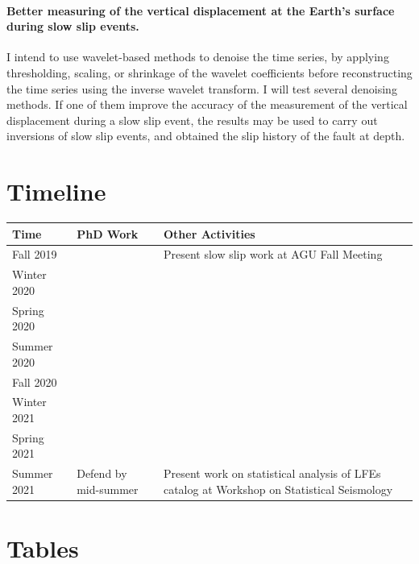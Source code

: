 \documentclass[letterpaper, 12pt]{article}
\begin{document}
\paragraph{Better measuring of the vertical displacement at the Earth's surface during slow slip events.}  I intend to use wavelet-based methods to denoise the time series, by applying thresholding, scaling, or shrinkage of the wavelet coefficients before reconstructing the time series using the inverse wavelet transform. I will test several denoising methods. If one of them improve the accuracy of the measurement of the vertical displacement during a slow slip event, the results may be used to carry out inversions of slow slip events, and obtained the slip history of the fault at depth.

\section{Timeline}

\begin{center}
\begin{tabular}{| p{3cm} p{6cm} p{6cm} |}
  \hline
  \textbf{Time} & \textbf{PhD Work} & \textbf{Other Activities} \\
  \hline
  Fall 2019 & & Present slow slip work at AGU Fall Meeting \\
  \hline
  Winter 2020 & & \\
  \hline
  Spring 2020 & & \\
  \hline
  Summer 2020 & & \\
  \hline
  Fall 2020 & & \\
  \hline
  Winter 2021 & & \\
  \hline
  Spring 2021 & & \\
  \hline
  Summer 2021 & Defend by mid-summer & Present work on statistical analysis of LFEs catalog at Workshop on Statistical Seismology \\
  \hline
\end{tabular}
\end{center}

\newpage
\setcounter{page}{1}




\newpage
\setcounter{page}{1}

\section*{Tables}
\end{document}
